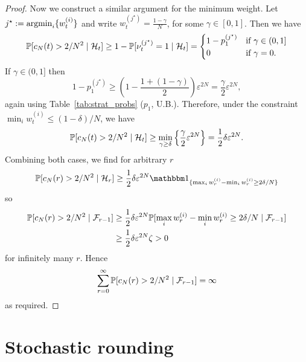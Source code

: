 \begin{proof}
Now we construct a similar argument for the minimum weight. Let $j^\star := \operatorname*{argmin}_i \{ w_t^{(i)} \}$ and write
$w_t^{(j^\star)} = \frac{1-\gamma}{N}$, for some $\gamma \in [0,1]$.
Then we have
\begin{equation*}
\mathbb{P}[ c_N(t) > 2/N^2 \mid \mathcal{H}_t ]
\geq 1- \mathbb{P}[ \nu_t^{(j^\star)} =1 \mid \mathcal{H}_t ]
=\begin{cases}
    1- p_1^{(j^\star)} & \text{if } \gamma \in (0,1] \\
    0 & \text{if } \gamma =0 .
\end{cases}
\end{equation*}
If $\gamma \in (0,1]$ then
\begin{equation*}
1- p_1^{(j^\star)}
\geq \left( 1- \frac{1+ (1-\gamma)}{2} \right) \varepsilon^{2N}
= \frac{ \gamma }{2} \varepsilon^{2N} ,
\end{equation*}
again using Table~\ref{tab:strat_probs} ($p_1$, U.B.).
Therefore, under the constraint $\min_i w_t^{(i)} \leq (1-\delta)/N$, we have
\begin{equation*}
\mathbb{P}[ c_N(t) > 2/N^2 \mid \mathcal{H}_t ]
\geq \min_{\gamma \geq \delta} 
        \left\{ \frac{ \gamma }{2} \varepsilon^{2N}
        \right\}
= \frac{1}{2} \delta \varepsilon^{2N} .
\end{equation*}
Combining both cases, we find for arbitrary $r$
\begin{equation*}
\Prob[ c_N(r) > 2/N^2 \mid \mathcal{H}_r ] 
\geq  \frac{1}{2} \delta \varepsilon^{2N} 
        \I{ \max_i w_r^{(i)} - \min_i w_r^{(i)} \geq 2\delta/N }
\end{equation*}
so
\begin{align*}
\mathbb{P}[ c_N(r) > 2/N^2 \mid \mathcal{F}_{r-1} ] 
&\geq  \frac{1}{2} \delta \varepsilon^{2N} 
        \mathbb{P}[ \max_i w_r^{(i)} - \min_i w_r^{(i)} \geq 2\delta/N 
        \mid \mathcal{F}_{r-1} ] \\
&\geq \frac{1}{2} \delta \varepsilon^{2N} \zeta
> 0
\end{align*}
for infinitely many $r$.
Hence
\begin{equation*}
\sum_{r=0}^\infty \mathbb{P}[ c_N(r) > 2/N^2  \mid \mathcal{F}_{r-1} ] = \infty
\end{equation*}
as required.
\end{proof}



\section{Stochastic rounding \seb{$\checkmark$} }

